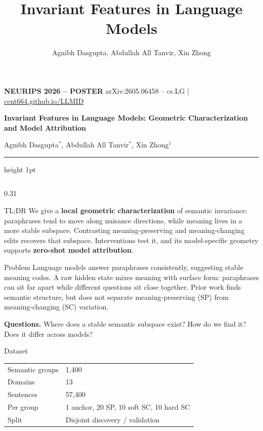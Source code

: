\documentclass[final,t]{beamer}
\title{Invariant Features in Language Models}
\author{Agnibh Dasgupta, Abdullah All Tanvir, Xin Zhong}
\institute{University of Nebraska Omaha}
\newcommand{\Key}[1]{\textbf{\color{AccentDeep}#1}}
\begin{document}
\begin{frame}[t,fragile]

{\scriptsize\color{Accent}\textbf{NEURIPS 2026 -- POSTER}}
\hfill
{\scriptsize\color{Muted}%
  arXiv:2605.06458 -- cs.LG \quad|\quad
  \href{https://cent664.github.io/LLMID/}{\color{Accent}cent664.github.io/LLMID}}

\vspace{0.15em}
{\LARGE\bfseries\color{Ink} Invariant Features in Language Models: Geometric Characterization and Model Attribution}

\vspace{0.15em}
{\normalsize Agnibh Dasgupta$^{*}$, Abdullah All Tanvir$^{*}$, Xin Zhong$^{\dagger}$
}

\vspace{0.25em}
{\color{Line}\hrule height 1pt}
\vspace{0.3em}

\begin{columns}[t,onlytextwidth]

\begin{column}{0.31\textwidth}

\begin{block}{TL;DR}
We give a \Key{local geometric characterization} of semantic invariance:
paraphrases tend to move along nuisance directions, while meaning lives in a
more stable subspace. Contrasting meaning-preserving and meaning-changing edits
recovers that subspace. Interventions test it, and its model-specific geometry
supports \Key{zero-shot model attribution}.
\end{block}

\begin{block}{Problem}
Language models answer paraphrases consistently, suggesting stable meaning
codes. A raw hidden state mixes meaning with surface form: paraphrases can sit
far apart while different questions sit close together. Prior work finds
semantic structure, but does not separate meaning-preserving (SP) from
meaning-changing (SC) variation.

\vspace{0.25em}
\Key{Questions.} Where does a stable semantic subspace exist? How do we find
it? Does it differ across models?
\end{block}

\begin{block}{Dataset}
\begin{tabular}{@{}ll@{}}
Semantic groups & 1{,}400 \\
Domains & 13 \\
Sentences & 57{,}400 \\
Per group & 1 anchor, 20 SP, 10 soft SC, 10 hard SC \\
Split & Disjoint discovery / validation \\
\end{tabular}


\end{block}
\end{column}
\end{columns}
\end{frame}
\end{document}
